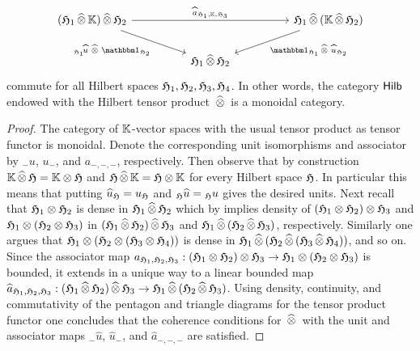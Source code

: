 \begin{proposition}
\begin{displaymath}
  \begin{tikzcd}
      ( \hilbertH_1 \cplttensor \fldK) \cplttensor \hilbertH_2 
      \ar[rrrr,"\widehat{a}_{\hilbertH_1,\fldK,\hilbertH_3}"] 
      \ar[drr,"{}_{\hilbertH_1}\!\widehat{u} \, \cplttensor \,\idn_{\hilbertH_2}",swap]& & && 
      \hilbertH_1 \cplttensor (\fldK \cplttensor \hilbertH_2 )
      \ar[dll,"\idn_{\hilbertH_1} \cplttensor \, \widehat{u}_{\hilbertH_2}"]  \\
      & & \hilbertH_1 \cplttensor \hilbertH_2 &  & 
  \end{tikzcd}
  \end{displaymath}
  commute for all Hilbert spaces $\mathfrak{H}_1,\mathfrak{H}_2,\mathfrak{H}_3,\mathfrak{H}_4$.  In other words,
  the category $\mathsf{Hilb}$ endowed with the Hilbert tensor product ${\,\widehat{\otimes}\,}$ is a monoidal  category. 
\end{proposition}

\begin{proof}
  The category of $\mathbb{K}$-vector spaces with the usual tensor product as tensor functor is monoidal.
  Denote the corresponding unit isomorphisms and associator by
  $_{-}u$, $u_{-}$, and $a_{-,-,-}$, respectively. Then observe that by construction
  $\mathbb{K} {\,\widehat{\otimes}\,} \mathfrak{H} = \mathbb{K} \otimes \mathfrak{H}$ and $\mathfrak{H} {\,\widehat{\otimes}\,} \mathbb{K} = \mathfrak{H} \otimes \mathbb{K}$
  for every Hilbert space $\mathfrak{H}$. In particular this means that putting  
  $\widehat{u}_{\mathfrak{H}} = u_{\mathfrak{H}}$ and ${}_{\mathfrak{H}}\widehat{u} = {}_{\mathfrak{H}}u$ gives the desired units.
  Next recall that  $\mathfrak{H}_1 \otimes \mathfrak{H}_2$ is dense in $\mathfrak{H}_1 {\,\widehat{\otimes}\,} \mathfrak{H}_2$ 
  which by  implies density of $(\mathfrak{H}_1 \otimes \mathfrak{H}_2) \otimes \mathfrak{H}_3$
  and $\mathfrak{H}_1 \otimes (\mathfrak{H}_2 \otimes \mathfrak{H}_3)$ in $(\mathfrak{H}_1 {\,\widehat{\otimes}\,} \mathfrak{H}_2) {\,\widehat{\otimes}\,} \mathfrak{H}_3$
  and $\mathfrak{H}_1 {\,\widehat{\otimes}\,} (\mathfrak{H}_2 {\,\widehat{\otimes}\,} \mathfrak{H}_3)$, respectively.
  Similarly one argues that $\mathfrak{H}_1 \otimes (\mathfrak{H}_2 \otimes (\mathfrak{H}_3\otimes \mathfrak{H}_4))$
  is dense in  $\mathfrak{H}_1 {\,\widehat{\otimes}\,} (\mathfrak{H}_2 {\,\widehat{\otimes}\,} (\mathfrak{H}_3{\,\widehat{\otimes}\,} \mathfrak{H}_4))$,
  and so on. Since the associator map
  $a_{\mathfrak{H}_1,\mathfrak{H}_2,\mathfrak{H}_3} : (\mathfrak{H}_1 \otimes \mathfrak{H}_2) \otimes \mathfrak{H}_3 \to
  \mathfrak{H}_1 \otimes ( \mathfrak{H}_2  \otimes \mathfrak{H}_3 )$ is bounded, it extends in a unique way to a linear
  bounded map $\widehat{a}_{\mathfrak{H}_1,\mathfrak{H}_2,\mathfrak{H}_3} : (\mathfrak{H}_1 {\,\widehat{\otimes}\,} \mathfrak{H}_2) {\,\widehat{\otimes}\,} \mathfrak{H}_3 \to
  \mathfrak{H}_1 {\,\widehat{\otimes}\,} ( \mathfrak{H}_2  {\,\widehat{\otimes}\,} \mathfrak{H}_3 )$. Using density, continuity, and commutativity
  of the pentagon and triangle diagrams for the tensor product functor one concludes that the coherence conditions for
  ${\,\widehat{\otimes}\,}$ with the unit and associator maps $_{-}\widehat{u}$, $\widehat{u}_{-}$, and $\widehat{a}_{-,-,-}$ are satisfied. 
\end{proof}